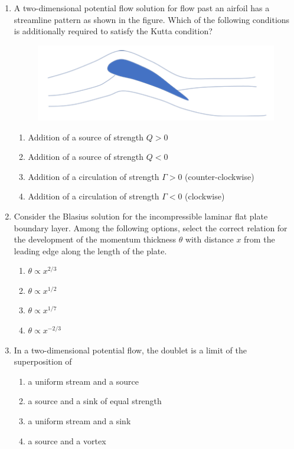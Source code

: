 \documentclass{article}
\begin{document}
\begin{enumerate}[leftmargin=*, resume]
\item A two-dimensional potential flow solution for flow past an airfoil has a streamline pattern as shown in the figure. Which of the following conditions is additionally required to satisfy the Kutta condition?
\begin{figure}[H]
    \centering
    \includegraphics[width=0.5\linewidth]{figs/q14.png}
    \caption{}
    \label{fig:q14}
\end{figure}
\begin{multicols}{2}
\begin{enumerate}
\item Addition of a source of strength $Q > 0$
\item Addition of a source of strength $Q < 0$
\item Addition of a circulation of strength $\Gamma > 0$ (counter-clockwise)
\item Addition of a circulation of strength $\Gamma < 0$ (clockwise)
\end{enumerate}
\end{multicols}

\item Consider the Blasius solution for the incompressible laminar flat plate boundary layer. Among the following options, select the correct relation for the development of the momentum thickness $\theta$ with distance $x$ from the leading edge along the length of the plate.
\begin{multicols}{4}
\begin{enumerate}
\item $\theta \propto x^{2/3}$
\item $\theta \propto x^{1/2}$
\item $\theta \propto x^{1/7}$
\item $\theta \propto x^{-2/3}$
\end{enumerate}
\end{multicols}

\item In a two-dimensional potential flow, the doublet is a limit of the superposition of
\begin{multicols}{2}
\begin{enumerate}
\item a uniform stream and a source
\item a source and a sink of equal strength
\item a uniform stream and a sink
\item a source and a vortex
\end{enumerate}
\end{multicols}


\end{enumerate}
\end{document}
